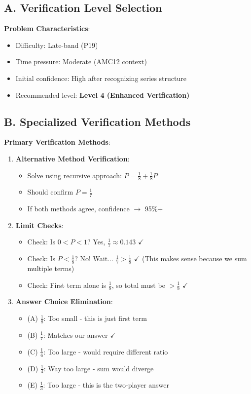 \documentclass[11pt]{article}
\begin{document}
\begin{verificationbox}
\subsection*{A. Verification Level Selection}

\textbf{Problem Characteristics}:
\begin{itemize}
    \item Difficulty: Late-band (P19)
    \item Time pressure: Moderate (AMC12 context)
    \item Initial confidence: High after recognizing series structure
    \item Recommended level: \textbf{Level 4 (Enhanced Verification)}
\end{itemize}

\subsection*{B. Specialized Verification Methods}

\textbf{Primary Verification Methods}:
\begin{enumerate}
    \item \textbf{Alternative Method Verification}:
    \begin{itemize}
        \item Solve using recursive approach: $P = \frac{1}{8} + \frac{1}{8}P$
        \item Should confirm $P = \frac{1}{7}$
        \item If both methods agree, confidence $\rightarrow$ 95\%+
    \end{itemize}
    
    \item \textbf{Limit Checks}:
    \begin{itemize}
        \item Check: Is $0 < P < 1$? Yes, $\frac{1}{7} \approx 0.143$ $\checkmark$
        \item Check: Is $P < \frac{1}{8}$? No! Wait... $\frac{1}{7} > \frac{1}{8}$ $\checkmark$ (This makes sense because we sum multiple terms)
        \item Check: First term alone is $\frac{1}{8}$, so total must be $> \frac{1}{8}$ $\checkmark$
    \end{itemize}
    
    \item \textbf{Answer Choice Elimination}:
    \begin{itemize}
        \item (A) $\frac{1}{8}$: Too small - this is just first term
        \item (B) $\frac{1}{7}$: Matches our answer $\checkmark$
        \item (C) $\frac{1}{6}$: Too large - would require different ratio
        \item (D) $\frac{1}{4}$: Way too large - sum would diverge
        \item (E) $\frac{1}{3}$: Too large - this is the two-player answer
    \end{itemize}
    

\end{enumerate}
\end{verificationbox}
\end{document}
